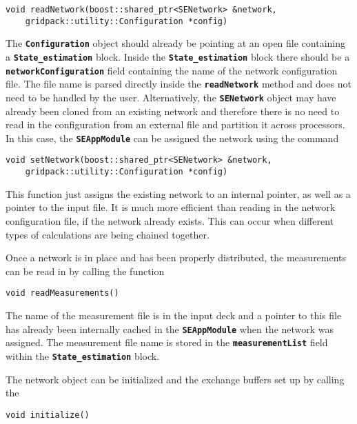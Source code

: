 {
\color{red}
\begin{Verbatim}[fontseries=b]
void readNetwork(boost::shared_ptr<SENetwork> &network,
    gridpack::utility::Configuration *config)
\end{Verbatim}
}

The \texttt{\textbf{Configuration}} object should already be pointing at an open file containing a \texttt{\textbf{State\_estimation}} block. Inside the \texttt{\textbf{State\_estimation}} block there should be a \texttt{\textbf{networkConfiguration}} field containing the name of the network configuration file. The file name is parsed directly inside the \texttt{\textbf{readNetwork}} method and does not need to be handled by the user.
Alternatively, the \texttt{\textbf{SENetwork}} object may have already been cloned from an existing network and therefore there is no need to read in the configuration from an external file and partition it across processors. In this case, the \texttt{\textbf{SEAppModule}} can be assigned the network using the command

{
\color{red}
\begin{Verbatim}[fontseries=b]
void setNetwork(boost::shared_ptr<SENetwork> &network,
    gridpack::utility::Configuration *config)
\end{Verbatim}
}

This function just assigns the existing network to an internal pointer, as well as a pointer to the input file. It is much more efficient than reading in the network configuration file, if the network already exists. This can occur when different types of calculations are being chained together.

Once a network is in place and has been properly distributed, the measurements can be read in by calling the function

{
\color{red}
\begin{Verbatim}[fontseries=b]
void readMeasurements()
\end{Verbatim}
}

The name of the measurement file is in the input deck and a pointer to this file has already been internally cached in the \texttt{\textbf{SEAppModule}} when the network was assigned. The measurement file name is stored in the \texttt{\textbf{measurementList}} field within the \texttt{\textbf{State\_estimation}} block.

The network object can be initialized and the exchange buffers set up by calling the

{
\color{red}
\begin{Verbatim}[fontseries=b]
void initialize()
\end{Verbatim}
}

